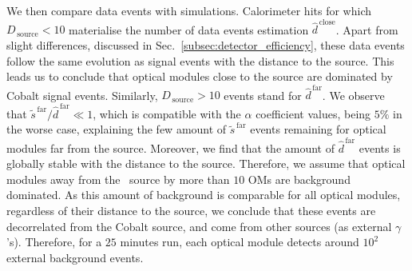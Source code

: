 We then compare data events with simulations.
Calorimeter hits for which $D_{\,\text{source}}<10$ materialise the number of data events estimation $\hat{d}^{\,\text{close}}$.
Apart from slight differences, discussed in Sec.~\ref{subsec:detector_efficiency}, these data events follow the same evolution as signal events with the distance to the source.
This leads us to conclude that optical modules close to the source are dominated by Cobalt signal events.
Similarly, $D_{\,\text{source}}>10$ events stand for $\hat{d}^{\,\text{far}}$.
We observe that $\tilde{s}^{\,\text{far}}/\hat{d}^{\,\text{far}} \ll 1$, which is compatible with the $\alpha$ coefficient values, being $5\%$ in the worse case, explaining the few amount of $\tilde{s}^{\,\text{far}}$ events remaining for optical modules far from the source.
Moreover, we find that the amount of $\hat{d}^{\,\text{far}}$ events is globally stable with the distance to the source.
Therefore, we assume that optical modules away from the \Co\ source by more than $10$ OMs are background dominated.
As this amount of background is comparable for all optical modules, regardless of their distance to the source, we conclude that these events are decorrelated from the Cobalt source, and come from other sources (as external $\gamma$'s).
Therefore, for a $25$ minutes run, each optical module detects around $10^{2}$ external background events.

